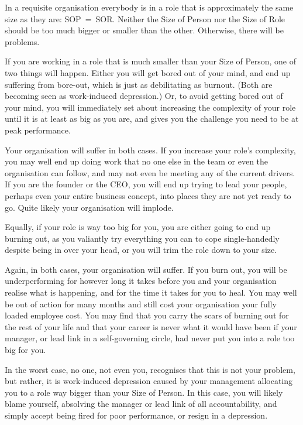 In a requisite organisation everybody is in a role that is approximately the same size as they are: SOP~=~SOR. Neither the Size of Person nor the Size of Role should be too much bigger or smaller than the other. Otherwise, there will be problems.


If you are working in a role that is much smaller than your Size of Person,  one of two things will happen. Either you will get bored out of your mind, and end up suffering from bore-out, which is just as debilitating as burnout. (Both are becoming seen as work-induced depression.) Or, to avoid getting bored out of your mind, you will immediately set about increasing the complexity of your role until it is at least as big as you are, and gives you the challenge you need to be at peak performance.


Your organisation will suffer in both cases. If you increase your role’s complexity, you may well end up doing work that no one else in the team or even the organisation can follow, and may not even be meeting any of the current drivers. If you are the founder or the CEO, you will end up trying to lead your people, perhaps even your entire business concept, into places they are not yet ready to go. Quite likely your organisation will implode.


Equally, if your role is way too big for you, you are either going to end up burning out, as you valiantly try everything you can to cope single-handedly despite being in over your head, or you will trim the role down to your size.


Again, in both cases, your organisation will suffer. If you burn out, you will be underperforming for however long it takes before you and your organisation realise what is happening, and for the time it takes for you to heal. You may well be out of action for many months and still cost your organisation your fully loaded employee cost. You may find that you carry the scars of burning out for the rest of your life and that your career is never what it would have been if your manager, or lead link in a self-governing circle, had never put you into a role too big for you. 


In the worst case, no one, not even you, recognises that this is not your problem, but rather, it is work-induced depression caused by your management allocating you to a role way bigger than your Size of Person.  In this case, you will likely blame yourself, absolving the manager or lead link of all accountability, and simply accept being fired for poor performance, or resign in a depression. 


